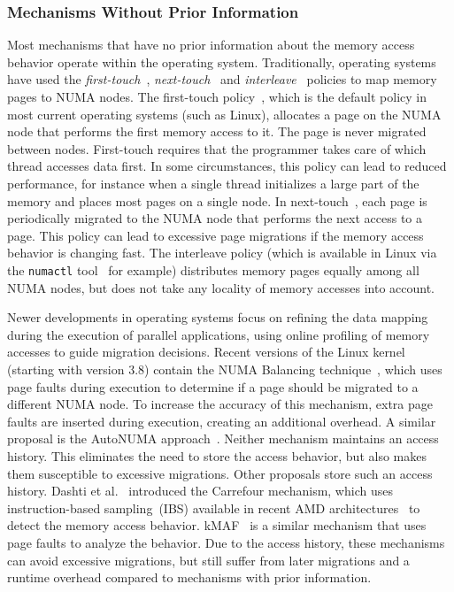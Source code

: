 \subsubsection{Mechanisms Without Prior Information}

Most mechanisms that have no prior information about the memory access behavior operate within the operating system.
Traditionally, operating systems have used the \emph{first-touch}~\cite{Marchetti1995}, \emph{next-touch}~\cite{Lof2005} and \emph{interleave}~\cite{Kleen2004} policies to map memory pages to NUMA nodes.
The first-touch policy~\cite{Marchetti1995}, which is the default policy in most current operating systems (such as Linux), allocates a page on the NUMA node that performs the first memory access to it.
The page is never migrated between nodes.
First-touch requires that the programmer takes care of which thread accesses data first.
In some circumstances, this policy can lead to reduced performance, for
instance when a single thread initializes a large part of the memory and places most pages on a single node.
In next-touch~\cite{Lof2005}, each page is periodically migrated to the NUMA node that performs the next access to a page.
This policy can lead to excessive page migrations if the memory access behavior is changing fast.
The interleave policy (which is available in Linux via the \texttt{numactl} tool~\cite{Kleen2004} for example) distributes memory pages equally among all NUMA nodes, but does not take any locality of memory accesses into account.

Newer developments in operating systems focus on refining the data mapping during the execution of parallel applications, using online profiling of memory accesses to guide migration decisions.
Recent versions of the Linux kernel (starting with version 3.8) contain the NUMA Balancing technique~\cite{Corbet}, which uses page faults during execution to determine if a page should be migrated to a different NUMA node. To increase the accuracy of this mechanism, extra page faults are inserted during execution, creating an additional overhead.
A similar proposal is the AutoNUMA approach~\cite{Corbet2012}.
Neither mechanism maintains an access history. This eliminates the need to store the access behavior, but also makes them susceptible to excessive migrations.
Other proposals store such an access history.
Dashti et al.~\cite{Dashti2013} introduced the Carrefour mechanism, which uses instruction-based sampling~(IBS) available in recent AMD architectures~\cite{AMD2012} to detect the memory access behavior.
kMAF~\cite{Diener2014} is a similar mechanism that uses page faults to analyze the behavior.
Due to the access history, these mechanisms can avoid excessive migrations, but still suffer from later migrations and a runtime overhead compared to mechanisms with prior information.

